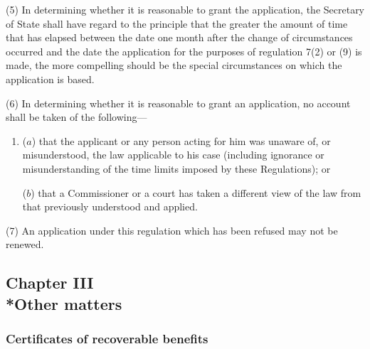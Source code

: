 \documentclass[12pt,a4paper]{article}
\begin{document}
(5) In determining whether it is reasonable to grant the application, the Secretary of State shall have regard to the principle that the greater the amount of time that has elapsed between the date one month after the change of circumstances occurred and the date the application for the purposes of regulation 7(2) 
or (9)  %
is made, the more compelling should be the special circumstances on which the application is based.

(6) In determining whether it is reasonable to grant an application, no account shall be taken of the following—
\begin{enumerate}\item[]
($a$) that the applicant or any person acting for him was unaware of, or misunderstood, the law applicable to his case (including ignorance or misunderstanding of the time limits imposed by these Regulations); or

($b$) that a Commissioner or a court has taken a different view of the law from that previously understood and applied.
\end{enumerate}

(7) An application under this regulation which has been refused may not be renewed.


\subsection[Chapter III --- Other matters]{Chapter III\\*Other matters}

\subsubsection[9. Certificates of recoverable benefits]{Certificates of recoverable benefits}

\renewcommand\parthead{--- Part II Chapter III}
\end{document}
